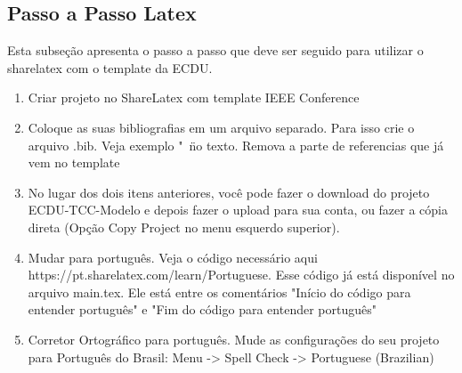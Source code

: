 \subsection{Passo a Passo Latex}\label{sec:passo-a-passo}
Esta subseção apresenta o passo a passo que deve ser seguido para utilizar o sharelatex com o template da ECDU.

\begin{enumerate}
\item Criar projeto no ShareLatex com template IEEE Conference
\item Coloque as suas bibliografias em um arquivo separado. Para isso crie o arquivo .bib. Veja exemplo "\
\" no texto. Remova a parte de referencias que já vem no template
\item No lugar dos dois itens anteriores, você pode fazer o download do projeto ECDU-TCC-Modelo e depois fazer o upload para sua conta, ou fazer a cópia direta (Opção Copy Project no menu esquerdo superior).
\item Mudar para português. Veja o código necessário aqui https://pt.sharelatex.com/learn/Portuguese. Esse código já está disponível no arquivo main.tex. Ele está entre os comentários "Início do código para entender português" e "Fim do código para entender português"
\item Corretor Ortográfico para português. Mude as configurações do seu projeto para Português do Brasil: Menu -> Spell Check -> Portuguese (Brazilian)
\end{enumerate}

